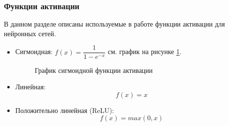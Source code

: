 \subsubsection{Функции активации}
В данном разделе описаны используемые в работе функции активации для нейронных сетей.
\begin{itemize}[wide]
    \item Сигмоидная:  $f(x) = \dfrac{1}{1-e^{-x}}$
    см. график на рисунке \ref{fig:sigm}.
        \begin{figure} [ht]
            \centering
            \caption{График сигмоидной функции активации}
            \label{fig:sigm}
        \end{figure}
    \item Линейная: 
    \begin{equation}
        f(x) = x
    \end{equation}
    \item Положительно линейная (ReLU):
    \begin{equation}
        f(x) = max(0, x)
    \end{equation}
    

\end{itemize}

